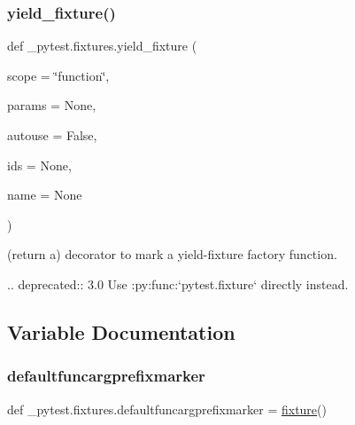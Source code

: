 \subsubsection{\texorpdfstring{yield\+\_\+fixture()}{yield\_fixture()}}
{\footnotesize\ttfamily def \+\_\+pytest.\+fixtures.\+yield\+\_\+fixture (\begin{DoxyParamCaption}\item[{}]{scope = {\ttfamily \char`\"{}function\char`\"{}},  }\item[{}]{params = {\ttfamily None},  }\item[{}]{autouse = {\ttfamily False},  }\item[{}]{ids = {\ttfamily None},  }\item[{}]{name = {\ttfamily None} }\end{DoxyParamCaption})}

\begin{DoxyVerb}(return a) decorator to mark a yield-fixture factory function.

.. deprecated:: 3.0
    Use :py:func:`pytest.fixture` directly instead.
\end{DoxyVerb}
 

\subsection{Variable Documentation}
\mbox{\label{namespace__pytest_1_1fixtures_a865b6418bbc806ac46031a25f5021f77}} 
\subsubsection{\texorpdfstring{defaultfuncargprefixmarker}{defaultfuncargprefixmarker}}
{\footnotesize\ttfamily def \+\_\+pytest.\+fixtures.\+defaultfuncargprefixmarker = \hyperlink{namespace__pytest_1_1fixtures_a7f10df0ff0d8d2c5e29e89f022c59d15}{fixture}()}

\mbox{\label{namespace__pytest_1_1fixtures_a88653bd907ec73d3cfd6dc4c6c9928fe}} 
